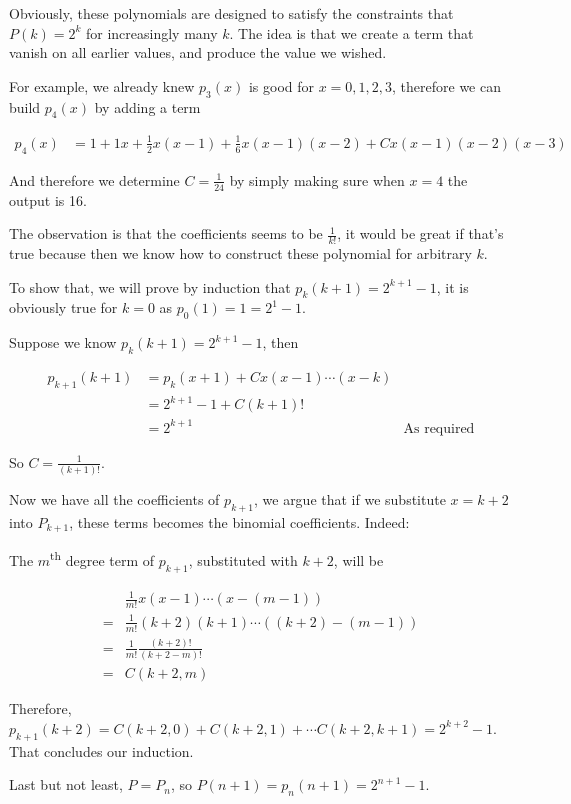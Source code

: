 \documentclass{article}
\begin{document}
Obviously, these polynomials are designed to satisfy the constraints that $ P(k) = 2^k $ for increasingly many $ k $. The idea is that we create a term that vanish on all earlier values, and produce the value we wished.

For example, we already knew $ p_3(x) $ is good for $ x = 0, 1, 2, 3 $, therefore we can build $ p_4(x) $ by adding a term 

\begin{align*}
  p_4(x) &= 1 + 1x + \frac{1}{2}x(x-1) + \frac{1}{6}x(x-1)(x-2) + Cx(x-1)(x-2)(x-3)
\end{align*}

And therefore we determine $ C = \frac{1}{24} $ by simply making sure when $ x = 4 $ the output is 16. 

The observation is that the coefficients seems to be $ \frac{1}{k!} $, it would be great if that's true because then we know how to construct these polynomial for arbitrary $ k $.

To show that, we will prove by induction that $ p_k(k+1) = 2^{k + 1} - 1 $, it is obviously true for $ k = 0 $ as $ p_0(1) = 1 = 2^{1} - 1 $.

Suppose we know $ p_k(k+1) = 2^{k + 1} - 1 $, then

\begin{align*}
  p_{k+1}(k+1) &= p_k(x + 1) + Cx(x-1)\cdots(x - k) \\
               &= 2^{k + 1} - 1 + C (k + 1)!        \\
               &= 2^{k + 1} &\text{As required}
\end{align*}

So $ C = \frac{1}{(k + 1)!} $.

Now we have all the coefficients of $ p_{k+1} $, we argue that if we substitute $ x = k + 2 $ into $ P_{k+1} $, these terms becomes the binomial coefficients. Indeed:

The $ m $\textsuperscript{th} degree term of $ p_{k+1} $, substituted with $ k + 2 $, will be

\begin{align*}
   & \frac{1}{m!}x(x-1)\cdots(x-(m-1))         \\
  =& \frac{1}{m!}(k+2)(k+1)\cdots((k+2)-(m-1)) \\
  =& \frac{1}{m!}\frac{(k+2)!}{(k+2 - m)!}     \\
  =& C(k+2, m)
\end{align*}

Therefore, $ p_{k+1}(k+2) = C(k+2, 0) + C(k+2, 1) + \cdots C(k+2, k+1) = 2^{k+2} - 1 $. That concludes our induction.

Last but not least, $ P = P_n $, so $ P(n + 1) = p_n(n + 1) = 2^{n+1} - 1 $.
\end{document}
